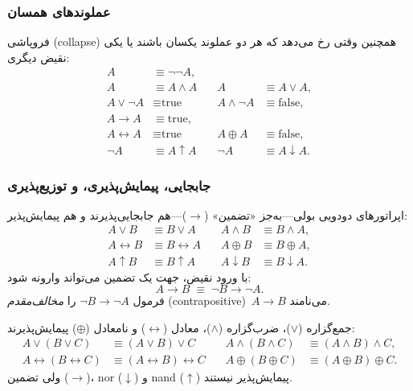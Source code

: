      \subsubsection*{عملوندهای همسان }
      فروپاشی (collapse) همچنین وقتی رخ می‌دهد که هر دو عملوند یکسان باشند یا یکی نقیض دیگری:
      \[
      \begin{aligned}
      A &\equiv \neg\neg A,\\
      A &\equiv A \land A
      &\quad
      A &\equiv A \lor A,\\
      A \lor \neg A &\equiv \text{true}
      &\quad
      A \land \neg A &\equiv \text{false},\\
      A \to A &\equiv \text{true},\\
      A \leftrightarrow A &\equiv \text{true}
      &\quad
      A \oplus A &\equiv \text{false},\\
      \neg A &\equiv A \uparrow A
      &\quad
      \neg A &\equiv A \downarrow A.
      \end{aligned}
      \]
      
      \subsubsection*{جابجایی، پیمایش‌پذیری، و توزیع‌پذیری}
      اپراتورهای دودویی بولی—به‌جز «تضمین» (\(\to\))—هم جابجایی‌پذیرند و هم پیمایش‌پذیر:
      \[
      \begin{aligned}
      A \lor B &\equiv B \lor A
      &\quad
      A \land B &\equiv B \land A,\\
      A \leftrightarrow B &\equiv B \leftrightarrow A
      &\quad
      A \oplus B &\equiv B \oplus A,\\
      A \uparrow B &\equiv B \uparrow A
      &\quad
      A \downarrow B &\equiv B \downarrow A.
      \end{aligned}
      \]
      با ورود نقیض، جهت یک تضمین می‌تواند وارونه شود:
      \[
      A \to B \;\equiv\; \neg B \to \neg A.
      \]
      فرمول \(\neg B \to \neg A\) را \emph{مخالف‌مقدم} (contrapositive) \(\,A \to B\) می‌نامند.
      
      جمع‌گزاره (\(\lor\))، ضرب‌گزاره (\(\land\))، معادل (\(\leftrightarrow\)) و نامعادل (\(\oplus\)) پیمایش‌پذیرند:
      \[
      \begin{aligned}
      A \lor (B \lor C) &\equiv (A \lor B) \lor C
      &\quad
      A \land (B \land C) &\equiv (A \land B) \land C,\\
      A \leftrightarrow (B \leftrightarrow C) &\equiv (A \leftrightarrow B) \leftrightarrow C
      &\quad
      A \oplus (B \oplus C) &\equiv (A \oplus B) \oplus C.
      \end{aligned}
      \]
      ولی تضمین (\(\to\))، nor (\(\downarrow\)) و nand (\(\uparrow\)) پیمایش‌پذیر نیستند.
      
